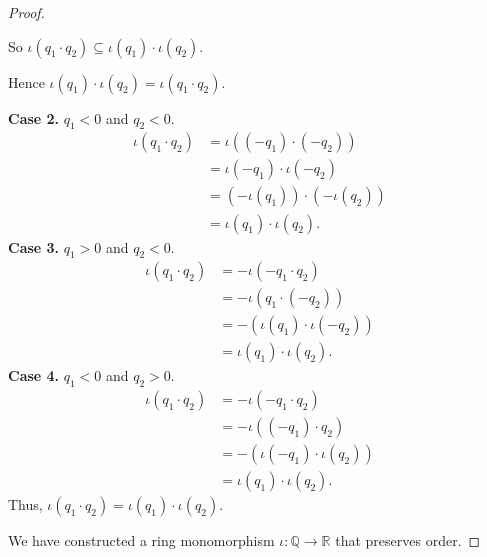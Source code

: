 \begin{proof}
\begin{itemize}
\begin{itemize}
                        So $\iota(q_{1}\cdot q_{2})\subseteq\iota(q_{1})\cdot\iota(q_{2})$.

                        Hence $\iota(q_{1})\cdot\iota(q_{2}) = \iota(q_{1}\cdot q_{2})$.

                        \textbf{Case 2.} $q_{1} < 0$ and $q_{2} < 0$.
                        \begin{align*}
                            \iota(q_{1}\cdot q_{2}) & = \iota((-q_{1})\cdot (-q_{2}))        \\
                                                    & = \iota(-q_{1})\cdot\iota(-q_{2})      \\
                                                    & = (-\iota(q_{1}))\cdot (-\iota(q_{2})) \\
                                                    & = \iota(q_{1})\cdot\iota(q_{2}).
                        \end{align*}
                        \textbf{Case 3.} $q_{1} > 0$ and $q_{2} < 0$.
                        \begin{align*}
                            \iota(q_{1}\cdot q_{2}) & = -\iota(-q_{1}\cdot q_{2})         \\
                                                    & = -\iota(q_{1}\cdot (-q_{2}))       \\
                                                    & = -(\iota(q_{1})\cdot\iota(-q_{2})) \\
                                                    & = \iota(q_{1})\cdot\iota(q_{2}).
                        \end{align*}
                        \textbf{Case 4.} $q_{1} < 0$ and $q_{2} > 0$.
                        \begin{align*}
                            \iota(q_{1}\cdot q_{2}) & = -\iota(-q_{1}\cdot q_{2})         \\
                                                    & = -\iota((-q_{1})\cdot q_{2})       \\
                                                    & = -(\iota(-q_{1})\cdot\iota(q_{2})) \\
                                                    & = \iota(q_{1})\cdot\iota(q_{2}).
                        \end{align*}
                        Thus, $\iota(q_{1}\cdot q_{2}) = \iota(q_{1})\cdot\iota(q_{2})$.
              \end{itemize}
    \end{itemize}

    We have constructed a ring monomorphism $\iota:\mathbb{Q}\to\mathbb{R}$ that preserves order.
\end{proof}

